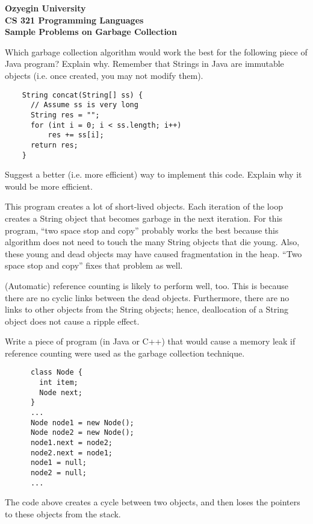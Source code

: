 \documentclass[addpoints]{exam}
\begin{document}
\begin{center}
{\Large \textbf{
    Ozyegin University\\
    CS 321 Programming Languages\\
    Sample Problems on Garbage Collection
}}
\end{center}

\begin{questions}
  \question
  Which garbage collection algorithm would work the best for the following
  piece of Java program? Explain why. Remember that Strings in Java are immutable
  objects (i.e. once created, you may not modify them).
  
  \begin{verbatim}
    String concat(String[] ss) {
      // Assume ss is very long
      String res = "";
      for (int i = 0; i < ss.length; i++)
          res += ss[i];
      return res;
    }
  \end{verbatim}

  Suggest a better (i.e. more efficient) way to implement this code.
  Explain why it would be more efficient.

  \begin{solutionbox}{4.5cm}
    This program creates a lot of short-lived objects.
    Each iteration of the loop creates a String object that becomes garbage
    in the next iteration.
    For this program, ``two space stop and copy'' probably works the best because
    this algorithm does not need to touch the many String objects that die young.
    Also, these young and dead objects may have caused fragmentation in the heap.
    ``Two space stop and copy'' fixes that problem as well.

    (Automatic) reference counting is likely to perform well, too.
    This is because there are no cyclic links between the dead objects.
    Furthermore, there are no links to other objects from the String objects;
    hence, deallocation of a String object does not cause a ripple effect. 
  \end{solutionbox}

  \question
  Write a piece of program (in Java or C++)
  that would cause a memory leak
  if reference counting were used
  as the garbage collection technique.

  \begin{solutionbox}{7.5cm}
    \begin{verbatim}
      class Node {
        int item;
        Node next;
      }
      ...
      Node node1 = new Node();
      Node node2 = new Node();
      node1.next = node2;
      node2.next = node1;
      node1 = null;
      node2 = null;
      ...
    \end{verbatim}
    The code above creates a cycle between two objects, and then loses the
    pointers to these objects from the stack. 
  \end{solutionbox}


\end{questions}
\end{document}
